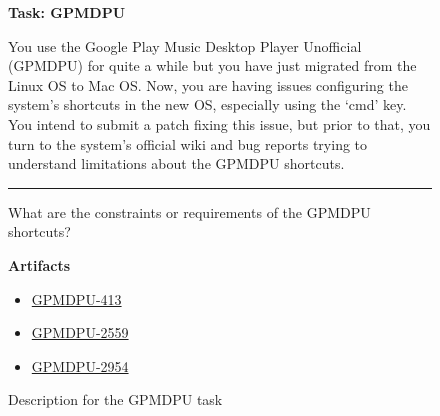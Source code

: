 \begin{figure}
\begin{mdframed}[backgroundcolor=gray!05] 
\begin{scriptsize}

{\large \textbf{Task: GPMDPU}} \bigskip


You use the Google Play Music Desktop Player Unofficial (GPMDPU) for quite a while but you
have just migrated from the Linux OS to Mac OS. Now, you are having issues configuring the
system's shortcuts in the new OS, especially using the `cmd' key. You intend to submit a patch
fixing this issue, but prior to that, you turn to the system's official wiki and bug reports trying to
understand limitations about the GPMDPU shortcuts.


\begin{center}
\rule{10cm}{0.4pt}
\end{center}

What are the constraints or requirements of the GPMDPU shortcuts?

\medskip

\textbf{Artifacts}

\begin{itemize}
    \item \href{https://github.com/MarshallOfSound/Google-Play-Music-Desktop-Player-UNOFFICIAL-/issues/413}{GPMDPU-413}
    \item \href{https://github.com/MarshallOfSound/Google-Play-Music-Desktop-Player-UNOFFICIAL-/issues/2559}{GPMDPU-2559}
    \item \href{https://github.com/MarshallOfSound/Google-Play-Music-Desktop-Player-UNOFFICIAL-/issues/2954}{GPMDPU-2954}
\end{itemize}

\end{scriptsize}
\end{mdframed}
\caption{Description for the GPMDPU task}
\end{figure}

    
